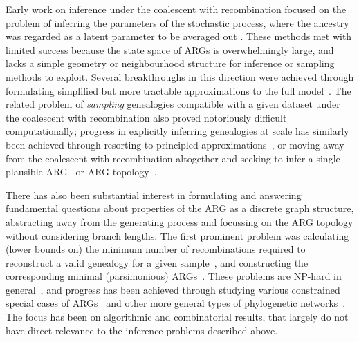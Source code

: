 \documentclass{article}
\begin{document}
Early work on inference under the coalescent with recombination
focused on the problem of
inferring the parameters of the
stochastic process, where the ancestry was regarded as a
latent parameter to be averaged out
\citep[e.g.][]{griffiths1996ancestral,kuhner2000maximum, nielsen2000estimation,
fearnhead2001estimating}.
These methods met with limited success
because the state space of ARGs is overwhelmingly large, and
lacks a simple geometry or neighbourhood structure for inference or
sampling methods to  exploit.
Several breakthroughs in this direction were achieved through
formulating simplified but more tractable approximations to the full
model~\citep{mcvean2005approximating,marjoram2006fast,li2011inference,
paul2011accurate,schiffels2014inferring}.
The related problem of \emph{sampling} genealogies compatible with a given
dataset under the coalescent with recombination also proved notoriously difficult
computationally; progress in explicitly inferring genealogies at scale
has similarly been achieved through resorting to principled
approximations~\citep{rasmussen2014genome,mahmoudi2022bayesian},
or moving away from the coalescent with recombination altogether and seeking
to infer a single plausible ARG~\citep[e.g.][]{speidel2019method} or ARG
topology~\citep[e.g.][]{minichiello2006mapping,kelleher2019inferring}.

There has also been substantial interest in formulating and answering
fundamental questions about properties
of the ARG as a discrete graph structure, abstracting away from the
generating process and focussing on the ARG topology without considering
branch lengths.
The first prominent problem was calculating (lower bounds on) the minimum number of
recombinations required to reconstruct a valid genealogy for a given
sample~\citep{myers2003bounds}, and constructing the corresponding
minimal (parsimonious)
ARGs~\citep{song2003parsimonious,song2005efficient,lyngso2005minimum}.
These problems are NP-hard in general~\citep{wang2001perfect}, and progress has
been achieved through studying various constrained special cases of ARGs~\citep[e.g.][]{gusfield2004optimal} and
other more general types of phylogenetic networks~\citep{huson2010phylogenetic}. The
focus has been on algorithmic and combinatorial results, that largely do not
have direct relevance to the inference problems described above.

\end{document}
